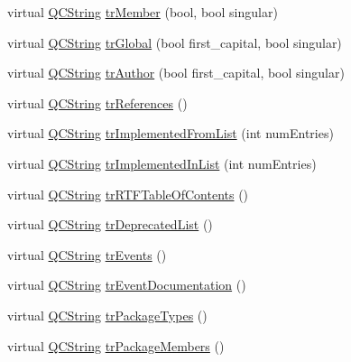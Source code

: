 \begin{DoxyCompactItemize}
\item 
virtual \mbox{\hyperlink{class_q_c_string}{Q\+C\+String}} \mbox{\hyperlink{class_translator_croatian_a1926acbe443abf154a47de6138890b03}{tr\+Member}} (bool, bool singular)
\item 
virtual \mbox{\hyperlink{class_q_c_string}{Q\+C\+String}} \mbox{\hyperlink{class_translator_croatian_ac79f4973d82c456a82fbc39585350c3d}{tr\+Global}} (bool first\+\_\+capital, bool singular)
\item 
virtual \mbox{\hyperlink{class_q_c_string}{Q\+C\+String}} \mbox{\hyperlink{class_translator_croatian_a17dc924e63b5b71a766b57e706b7ddac}{tr\+Author}} (bool first\+\_\+capital, bool singular)
\item 
virtual \mbox{\hyperlink{class_q_c_string}{Q\+C\+String}} \mbox{\hyperlink{class_translator_croatian_a1504ced62753533e0ed158a2fb441b0d}{tr\+References}} ()
\item 
virtual \mbox{\hyperlink{class_q_c_string}{Q\+C\+String}} \mbox{\hyperlink{class_translator_croatian_a9387908f11cf090eceeb2da2665e1a35}{tr\+Implemented\+From\+List}} (int num\+Entries)
\item 
virtual \mbox{\hyperlink{class_q_c_string}{Q\+C\+String}} \mbox{\hyperlink{class_translator_croatian_a51487cd62929b05a2fae49c8aadc4ffb}{tr\+Implemented\+In\+List}} (int num\+Entries)
\item 
virtual \mbox{\hyperlink{class_q_c_string}{Q\+C\+String}} \mbox{\hyperlink{class_translator_croatian_ab6959dccc3e12d855f27ee6f3fd1488e}{tr\+R\+T\+F\+Table\+Of\+Contents}} ()
\item 
virtual \mbox{\hyperlink{class_q_c_string}{Q\+C\+String}} \mbox{\hyperlink{class_translator_croatian_af7cd6d83c8594fcee8e0f337ba51138a}{tr\+Deprecated\+List}} ()
\item 
virtual \mbox{\hyperlink{class_q_c_string}{Q\+C\+String}} \mbox{\hyperlink{class_translator_croatian_abc08e45d3be4d63c9a26f5b91f247d4b}{tr\+Events}} ()
\item 
virtual \mbox{\hyperlink{class_q_c_string}{Q\+C\+String}} \mbox{\hyperlink{class_translator_croatian_a9e35b757b69a0d6879f6abd64d8f91ca}{tr\+Event\+Documentation}} ()
\item 
virtual \mbox{\hyperlink{class_q_c_string}{Q\+C\+String}} \mbox{\hyperlink{class_translator_croatian_a4ce8a6d0ef5cc97fc5df8527e7aa4a3b}{tr\+Package\+Types}} ()
\item 
virtual \mbox{\hyperlink{class_q_c_string}{Q\+C\+String}} \mbox{\hyperlink{class_translator_croatian_ab2c5735f9ad7d480f81ca53583f8be4b}{tr\+Package\+Members}} ()

\end{DoxyCompactItemize}
